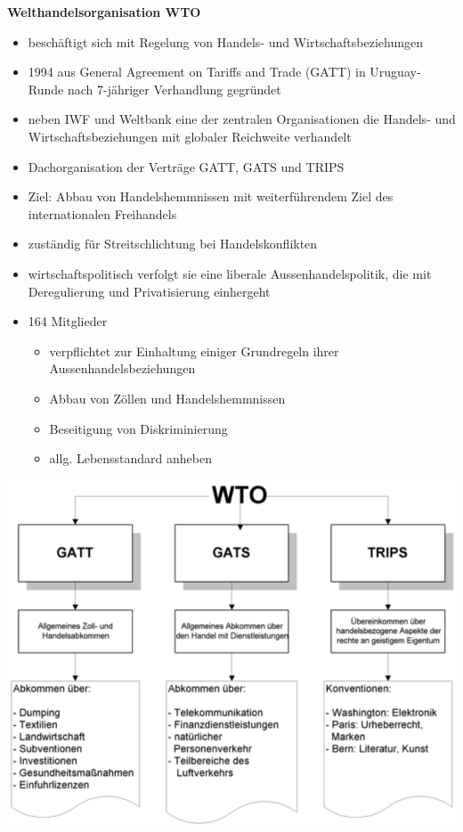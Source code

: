 \begin{minipage}{0.65\linewidth}
	\textbf{Welthandelsorganisation WTO}
	\begin{itemize}
		\item beschäftigt sich mit Regelung von Handels- und Wirtschaftsbeziehungen
		\item 1994 aus General Agreement on Tariffs and Trade (GATT) in Uruguay-Runde nach 7-jähriger Verhandlung gegründet
		\item neben IWF und Weltbank eine der zentralen Organisationen die Handels- und Wirtschaftsbeziehungen mit globaler Reichweite verhandelt
		\item Dachorganisation der Verträge GATT, GATS und TRIPS
		\item Ziel: Abbau von Handelshemmnissen mit weiterführendem Ziel des internationalen Freihandels
		\item zuständig für Streitschlichtung bei Handelskonflikten
		\item wirtschaftspolitisch verfolgt sie eine liberale Aussenhandelspolitik, die mit Deregulierung und Privatisierung einhergeht
		\item 164 Mitglieder
		\begin{itemize}
			\item verpflichtet zur Einhaltung einiger Grundregeln ihrer Aussenhandelsbeziehungen
			\item Abbau von Zöllen und Handelshemmnissen
			\item Beseitigung von Diskriminierung
			\item allg. Lebensstandard anheben
		\end{itemize}
	\end{itemize}
\end{minipage}
\begin{minipage}{0.3\linewidth}
	\includegraphics[width=\linewidth]{images/wto.png}
\end{minipage}%
